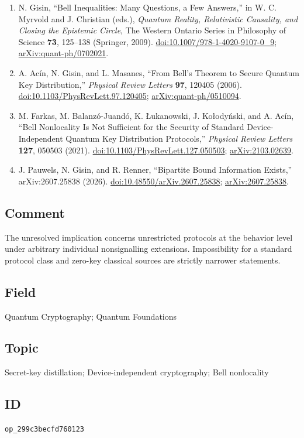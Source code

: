 \begin{enumerate}[label={},leftmargin=4.8em,labelsep=0.5em]
  \footnotesize
  \item[\textup{[Gis09]}]\label{ref:p30-gisin}
  N. Gisin, ``Bell Inequalities: Many Questions, a Few Answers,'' in
  W. C. Myrvold and J. Christian (eds.), \emph{Quantum Reality, Relativistic
  Causality, and Closing the Epistemic Circle}, The Western Ontario Series in
  Philosophy of Science \textbf{73}, 125--138 (Springer, 2009).
  \href{https://doi.org/10.1007/978-1-4020-9107-0_9}{doi:10.1007/978-1-4020-9107-0\_9};
  \href{https://arxiv.org/abs/quant-ph/0702021}{arXiv:quant-ph/0702021}.

  \item[\textup{[AGM06]}]\label{ref:p30-acin}
  A. Ac\'in, N. Gisin, and L. Masanes, ``From Bell's Theorem to Secure Quantum
  Key Distribution,'' \emph{Physical Review Letters} \textbf{97}, 120405
  (2006). \href{https://doi.org/10.1103/PhysRevLett.97.120405}{doi:10.1103/PhysRevLett.97.120405};
  \href{https://arxiv.org/abs/quant-ph/0510094}{arXiv:quant-ph/0510094}.

  \item[\textup{[FBJLA21]}]\label{ref:p30-farkas}
  M. Farkas, M. Balanz\'o-Juand\'o, K. \L{}ukanowski, J. Ko{\l}ody\'nski, and
  A. Ac\'in, ``Bell Nonlocality Is Not Sufficient for the Security of Standard
  Device-Independent Quantum Key Distribution Protocols,'' \emph{Physical
  Review Letters} \textbf{127}, 050503 (2021).
  \href{https://doi.org/10.1103/PhysRevLett.127.050503}{doi:10.1103/PhysRevLett.127.050503};
  \href{https://arxiv.org/abs/2103.02639}{arXiv:2103.02639}.

  \item[\textup{[PGR26]}]\label{ref:p30-pauwels}
  J. Pauwels, N. Gisin, and R. Renner, ``Bipartite Bound Information Exists,''
  arXiv:2607.25838 (2026).\newline
  \href{https://doi.org/10.48550/arXiv.2607.25838}{doi:10.48550/arXiv.2607.25838};
  \href{https://arxiv.org/abs/2607.25838}{arXiv:2607.25838}.
\end{enumerate}

\subsection*{Comment}

The unresolved implication concerns unrestricted protocols at the behavior
level under arbitrary individual nonsignalling extensions.  Impossibility
for a standard protocol class and zero-key classical sources are strictly
narrower statements.

\subsection*{Field}

Quantum Cryptography; Quantum Foundations

\subsection*{Topic}

Secret-key distillation; Device-independent cryptography; Bell nonlocality

\subsection*{ID}

\texttt{op\_299c3becfd760123}
